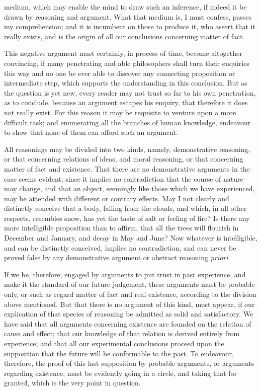 \documentclass[]{article}
\begin{document}
\begin{sectionbody}
medium, which may enable the mind to draw such an inference, if indeed it be drawn by reasoning and argument. What that medium is, I must confess, passes my comprehension; and it is incumbent on those to produce it, who assert that it really exists, and is the origin of all our conclusions concerning matter of fact.

\humeparagraph  This negative argument must certainly, in process of time, become altogether convincing, if many penetrating and able philosophers shall turn their enquiries this way and no one be ever able to discover any connecting proposition or intermediate step, which supports the understanding in this conclusion. But as the question is yet new, every reader may not trust so far to his own penetration, as to conclude, because an argument escapes his enquiry, that therefore it does not really exist. For this reason it may be requisite to venture upon a more difficult task; and enumerating all the branches of human knowledge, endeavour to show that none of them can afford such an argument.

\humeparagraph  All reasonings may be divided into two kinds, namely, demonstrative reasoning, or that concerning relations of ideas, and moral reasoning, or that concerning matter of fact and existence. That there are no demonstrative arguments in the case seems evident; since it implies no contradiction that the course of nature may change, and that an object, seemingly like those which we have experienced, may be attended with different or contrary effects. May I not clearly and distinctly conceive that a body, falling from the clouds, and which, in all other respects, resembles snow, has yet the taste of salt or feeling of fire? Is there any more intelligible proposition than to affirm, that all the trees will flourish in December and January, and decay in May and June? Now whatever is intelligible, and can be distinctly conceived, implies no contradiction, and can never be proved false by any demonstrative argument or abstract reasoning \emph{ priori}.

\humeparagraph  If we be, therefore, engaged by arguments to put trust in past experience, and make it the standard of our future judgement, these arguments must be probable only, or such as regard matter of fact and real existence, according to the division above mentioned. But that there is no argument of this kind, must appear, if our explication of that species of reasoning be admitted as solid and satisfactory. We have said that all arguments concerning existence are founded on the relation of cause and effect; that our knowledge of that relation is derived entirely from experience; and that all our experimental conclusions proceed upon the supposition that the future will be conformable to the past. To endeavour, therefore, the proof of this last supposition by probable arguments, or arguments regarding existence, must be evidently going in a circle, and taking that for granted, which is the very point in question.


\end{sectionbody}
\end{document}
